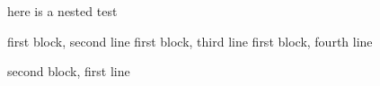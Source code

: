 here is a nested test
\begin{one}
		first block, second line
		first block, third line
		first block, fourth line
\begin{two}
	second block, first line
\end{two}
\end{one}
